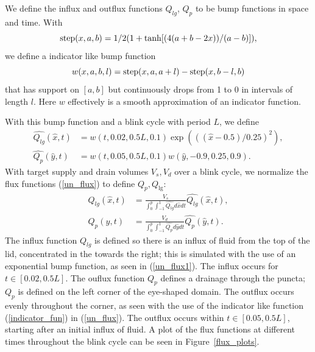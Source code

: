 %
%
\label{sec:flux}

We define the influx and outflux functions $Q_{lg}$, $Q_{p}$ to be bump functions in space and time. With
\begin{equation}
\operatorname{step}(x,a,b) = 1/2 (1 + \tanh[(4 (a + b - 2 x))/(a - b)]),
\end{equation}
we define a indicator like bump function
\begin{equation}
w(x,a,b,l) = \operatorname{step}(x,a,a+l)-\operatorname{step}(x,b-l,b)
\label{indicator_fun}
\end{equation}
that has support on $[a,b]$ but continuously drops from 1 to 0 in intervals of length $l$. Here $w$ effectively is a smooth approximation of an indicator function. 

 With this bump function and a blink cycle with period $L$, we define
\begin{eqnarray}
\hat{Q_{lg}}(\hat{x},t) &= w(t,0.02,0.5 L,0.1) \exp(((\hat{x}-0.5)/0.25)^2), \label{bumb_funs}  \\
\hat{Q_{p}}(\hat{y},t) &= w(t,0.05,0.5 L,0.1) w(\hat{y},-0.9,0.25,0.9). 
\end{eqnarray}
With target supply and drain volumes $V_s, V_d$ over a blink cycle, we normalize the flux functions (\ref{un_flux}) to define $Q_p,Q_{\lg}$:
\begin{eqnarray}
Q_{lg}(\hat{x},t) &= \frac{V_s}{\int_{0}^{p} \int_{-1}^1 \hat{Q_{lg}} d\hat{x} dt} \hat{Q_{lg}}(\hat{x},t), \label{un_flux1} \\
Q_{p}(\hat{y},t) &= \frac{V_d}{\int_{0}^{p} \int_{-1}^1 \hat{Q_{p}} d\hat{y} dt} \hat{Q_{p}}(\hat{y},t).
\label{un_flux}
\end{eqnarray}
The influx function $Q_{lg}$ is defined so there is an influx of fluid from the top of the lid, concentrated in the towards the right; this is simulated with the use of an exponential bump function, as seen in (\ref{un_flux1}). The influx occurs for $t \in [0.02,0.5 L]$. The ouflux function $Q_p$ defines a drainage through the puncta; $Q_p$ is defined on the left corner of the eye-shaped domain. The outflux occurs evenly throughout the corner, as seen with the use of the indicator like function (\ref{indicator_fun})  in (\ref{un_flux}). The outflux occurs within $t \in [0.05,0.5 L]$, starting after an initial influx of fluid. A plot of the flux functions at different times throughout the blink cycle can be seen in Figure~\ref{flux_plots}.

